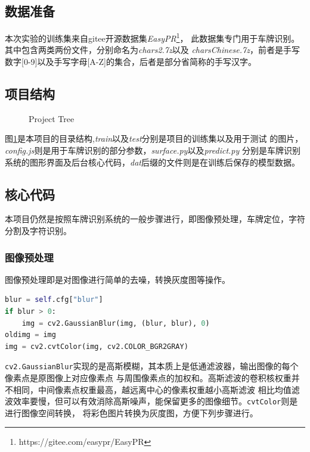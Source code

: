 \documentclass[UTF8,10pt,titlepage,a4paper]{ctexart}
\begin{document}
\subsection{数据准备}
本次实验的训练集来自gitee开源数据集\emph{EasyPR}\footnote{https://gitee.com/easypr/EasyPR}，
此数据集专门用于车牌识别。其中包含两类两份文件，分别命名为\emph{chars2.7z}以及
\emph{charsChinese.7z}，前者是手写数字[0-9]以及手写字母[A-Z]的集合，后者是部分省简称的手写汉字。
\subsection{项目结构}
\begin{figure}[h]
\caption{Project Tree}
\label{ref:tree}
\end{figure}
图\ref{ref:tree}是本项目的目录结构,\emph{train}以及\emph{test}分别是项目的训练集以及用于测试
的图片，\emph{config.js}则是用于车牌识别的部分参数，\emph{surface.py}以及\emph{predict.py}
分别是车牌识别系统的图形界面及后台核心代码，\emph{dat}后缀的文件则是在训练后保存的模型数据。
\subsection{核心代码}
本项目仍然是按照车牌识别系统的一般步骤进行，即图像预处理，车牌定位，字符分割及字符识别。
\subsubsection{图像预处理}
图像预处理即是对图像进行简单的去噪，转换灰度图等操作。\\
\begin{lstlisting}[language=python]
blur = self.cfg["blur"]
if blur > 0:
	img = cv2.GaussianBlur(img, (blur, blur), 0)
oldimg = img
img = cv2.cvtColor(img, cv2.COLOR_BGR2GRAY)
\end{lstlisting}
\newpage
\verb|cv2.GaussianBlur|实现的是高斯模糊，其本质上是低通滤波器，输出图像的每个像素点是原图像上对应像素点
与周围像素点的加权和。高斯滤波的卷积核权重并不相同，中间像素点权重最高，越远离中心的像素权重越小高斯滤波
相比均值滤波效率要慢，但可以有效消除高斯噪声，能保留更多的图像细节。\verb|cvtColor|则是进行图像空间转换，
将彩色图片转换为灰度图，方便下列步骤进行。
\end{document}
